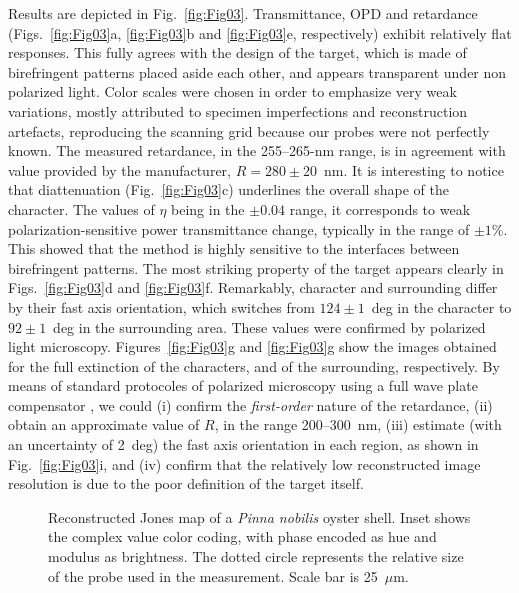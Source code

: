 \documentclass[aps,prl,twocolumn,amsmath]{revtex4-1}
\begin{document}
Results are depicted in Fig.~\ref{fig:Fig03}. Transmittance, OPD and retardance (Figs.~\ref{fig:Fig03}a, \ref{fig:Fig03}b and \ref{fig:Fig03}e, respectively) exhibit relatively flat responses. This fully agrees with the design of the target, which is made of birefringent patterns placed aside each other, and appears transparent under non polarized light. Color scales were chosen in order to emphasize very weak variations, mostly attributed to specimen imperfections and reconstruction artefacts, reproducing the scanning grid because our probes were not perfectly known. The measured retardance, in the 255--265-nm range, is in agreement with value provided by the manufacturer, $R = 280\pm20$~nm. It is interesting to notice that diattenuation (Fig.~\ref{fig:Fig03}c) underlines the overall shape of the character. The values of $\eta$ being in the $\pm0.04$ range, it corresponds to weak polarization-sensitive power transmittance change, typically in the range of $\pm 1\%$. This showed that the method is highly sensitive to the interfaces between birefringent patterns. The most striking property of the target appears clearly in Figs.~\ref{fig:Fig03}d and \ref{fig:Fig03}f. Remarkably, character and surrounding differ by their fast axis orientation, which switches from $124\pm1$~deg in the character to $92\pm1$~deg in the surrounding area. These values were confirmed by polarized light microscopy. Figures~\ref{fig:Fig03}g and \ref{fig:Fig03}g show the images obtained for the full extinction of the characters, and of the surrounding, respectively. By means of standard protocoles of polarized microscopy using a full wave plate compensator \cite{Murphy2002}, we could (i) confirm the \emph{first-order} nature of the retardance, (ii) obtain an approximate value of $R$, in the range 200--300~nm, (iii) estimate (with an uncertainty of 2~deg) the fast axis orientation in each region, as shown in Fig.~\ref{fig:Fig03}i, and (iv) confirm that the relatively low reconstructed image resolution is due to the poor definition of the target itself.

\begin{figure}[!h]
\centering
{}
\caption{Reconstructed Jones map of a \emph{Pinna nobilis} oyster shell. Inset shows the complex value color coding, with phase encoded as hue and modulus as brightness. The dotted circle represents the relative size of the probe used in the measurement. Scale bar is 25~$\mu$m.}
\label{fig:Fig04}
\end{figure}
\end{document}
